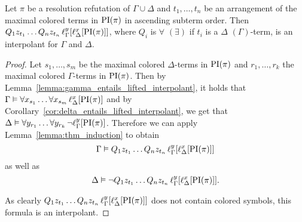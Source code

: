 \begin{thm}
	\label{thm:two_phases}
	Let $\pi$ be a resolution refutation of $\Gamma \cup \Delta$ and
	$t_1, \dots, t_n$ be an arrangement of the maximal colored terms in $\PI(\pi)$ in ascending subterm order.
	Then
	$Q_1 z_{t_1} \ldots Q_n z_{t_n}\,\lifgamma{\lifdelta{\PI(\pi)}}$, where $Q_i$ is $\forall$ $(\exists)$ if ${t_i}$ is a $\Delta$ $(\Gamma)$-term, is an interpolant for $\Gamma$ and $\Delta$.
\end{thm}
\begin{proof}
	Let $s_1, \dots, s_m$ be the maximal colored $\Delta$-terms in $\PI(\pi)$ and
	$r_1, \dots, r_k$ the maximal colored $\Gamma$-terms in $\PI(\pi)$.
	Then by Lemma~\ref{lemma:gamma_entails_lifted_interpolant}, it holds that 
	$\Gamma \entails \forall x_{s_1} \ldots \forall x_{s_m}\,\lifdelta{\PI(\pi)}$
	and by Corollary~\ref{cor:delta_entails_lifted_interpolant}, we get that 
	$\Delta \entails \forall y_{r_1} \dots \forall y_{r_{k}}\,\lnot \lift{\Gamma}{\PI(\pi)}{y}$.
	Therefore we can apply Lemma~\ref{lemma:thm_induction} to obtain 
	\[\Gamma \entails Q_1 z_{t_1} \ldots Q_n z_{t_n}\,\lifgamma{\lifdelta{\PI(\pi)}}\]
	as well as 
	\[\Delta \entails \lnot Q_1 z_{t_1} \ldots Q_n z_{t_n}\,\lifgamma{\lifdelta{\PI(\pi)}}.\]

	As clearly $Q_1 z_{t_1} \dots Q_n z_{t_n}\,\lft{\Gamma}{y}{\lft{\Delta}{x}{\PI(\pi)}}$ does not contain colored symbols, this formula is an interpolant.
\end{proof}
